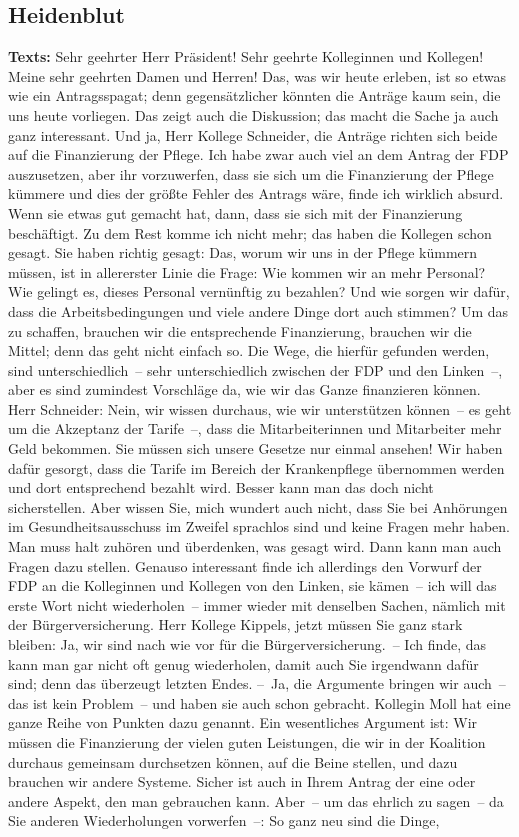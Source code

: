 \documentclass{article}
\begin{document}
\subsection{Heidenblut}
\noindent\textbf{Texts:} Sehr geehrter Herr Präsident! Sehr geehrte Kolleginnen und Kollegen! Meine sehr geehrten Damen und Herren! Das, was wir heute erleben, ist so etwas wie ein Antragsspagat; denn gegensätzlicher könnten die Anträge kaum sein, die uns heute vorliegen. Das zeigt auch die Diskussion; das macht die Sache ja auch ganz interessant. Und ja, Herr Kollege Schneider, die Anträge richten sich beide auf die Finanzierung der Pflege. Ich habe zwar auch viel an dem Antrag der FDP auszusetzen, aber ihr vorzuwerfen, dass sie sich um die Finanzierung der Pflege kümmere und dies der größte Fehler des Antrags wäre, finde ich wirklich absurd.  Wenn sie etwas gut gemacht hat, dann, dass sie sich mit der Finanzierung beschäftigt. Zu dem Rest komme ich nicht mehr; das haben die Kollegen schon gesagt.  Sie haben richtig gesagt: Das, worum wir uns in der Pflege kümmern müssen, ist in allererster Linie die Frage: Wie kommen wir an mehr Personal? Wie gelingt es, dieses Personal vernünftig zu bezahlen?  Und wie sorgen wir dafür, dass die Arbeitsbedingungen und viele andere Dinge dort auch stimmen? Um das zu schaffen, brauchen wir die entsprechende Finanzierung, brauchen wir die Mittel; denn das geht nicht einfach so. Die Wege, die hierfür gefunden werden, sind unterschiedlich – sehr unterschiedlich zwischen der FDP und den Linken –, aber es sind zumindest Vorschläge da, wie wir das Ganze finanzieren können. Herr Schneider: Nein, wir wissen durchaus, wie wir unterstützen können – es geht um die Akzeptanz der Tarife –, dass die Mitarbeiterinnen und Mitarbeiter mehr Geld bekommen. Sie müssen sich unsere Gesetze nur einmal ansehen! Wir haben dafür gesorgt, dass die Tarife im Bereich der Krankenpflege übernommen werden und dort entsprechend bezahlt wird.  Besser kann man das doch nicht sicherstellen. Aber wissen Sie, mich wundert auch nicht, dass Sie bei Anhörungen im Gesundheitsausschuss im Zweifel sprachlos sind und keine Fragen mehr haben. Man muss halt zuhören und überdenken, was gesagt wird. Dann kann man auch Fragen dazu stellen.  Genauso interessant finde ich allerdings den Vorwurf der FDP an die Kolleginnen und Kollegen von den Linken, sie kämen – ich will das erste Wort nicht wiederholen – immer wieder mit denselben Sachen, nämlich mit der Bürgerversicherung. Herr Kollege Kippels, jetzt müssen Sie ganz stark bleiben: Ja, wir sind nach wie vor für die Bürgerversicherung. – Ich finde, das kann man gar nicht oft genug wiederholen, damit auch Sie irgendwann dafür sind; denn das überzeugt letzten Endes.  – Ja, die Argumente bringen wir auch – das ist kein Problem – und haben sie auch schon gebracht. Kollegin Moll hat eine ganze Reihe von Punkten dazu genannt. Ein wesentliches Argument ist: Wir müssen die Finanzierung der vielen guten Leistungen, die wir in der Koalition durchaus gemeinsam durchsetzen können, auf die Beine stellen, und dazu brauchen wir andere Systeme. Sicher ist auch in Ihrem Antrag der eine oder andere Aspekt, den man gebrauchen kann. Aber – um das ehrlich zu sagen – da Sie anderen Wiederholungen vorwerfen –: So ganz neu sind die Dinge, 
\end{document}
